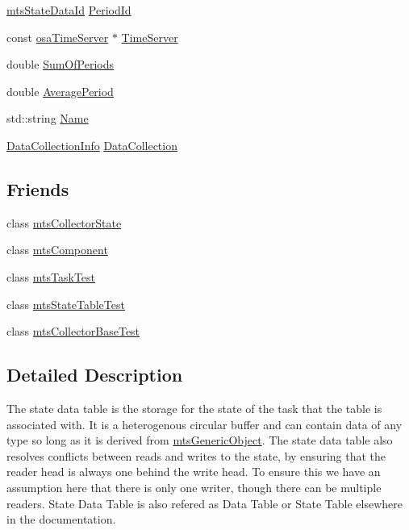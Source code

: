 \begin{DoxyCompactItemize}
\item 
\hyperlink{mts_state_table_8h_ac3a0e34e8991d51790b043fa01857a35}{mts\-State\-Data\-Id} \hyperlink{classmts_state_table_a1035a10fa91b94e61061abbd049d9eb6}{Period\-Id}
\item 
const \hyperlink{classosa_time_server}{osa\-Time\-Server} $\ast$ \hyperlink{classmts_state_table_a3d0a1bf75c293caad7ab30cd581b18e4}{Time\-Server}
\item 
double \hyperlink{classmts_state_table_a57adbe08f57772500f8066c64ad5b49b}{Sum\-Of\-Periods}
\item 
double \hyperlink{classmts_state_table_a5005978e1547af1b2b864fa366585468}{Average\-Period}
\item 
std\-::string \hyperlink{classmts_state_table_ad526708a4622c8cc4d9398bdb6b9ad5e}{Name}
\item 
\hyperlink{classmts_state_table_1_1_data_collection_info}{Data\-Collection\-Info} \hyperlink{classmts_state_table_ae1da5c16bcb4faa19c35c2cfb1dee023}{Data\-Collection}
\end{DoxyCompactItemize}
\subsection*{Friends}
\begin{DoxyCompactItemize}
\item 
class \hyperlink{classmts_state_table_ab6a86199b0302ca067ec09ec393d2ec5}{mts\-Collector\-State}
\item 
class \hyperlink{classmts_state_table_ae29f4c60efad294ccb670e319c43a4c1}{mts\-Component}
\item 
class \hyperlink{classmts_state_table_a6cdb4e8009fd76a9cf7e4e42b4bd0b8d}{mts\-Task\-Test}
\item 
class \hyperlink{classmts_state_table_a9113306eea81a3c08902921aefadbe22}{mts\-State\-Table\-Test}
\item 
class \hyperlink{classmts_state_table_a6743a1c340e3a1cc2078915e17f6678e}{mts\-Collector\-Base\-Test}
\end{DoxyCompactItemize}


\subsection{Detailed Description}
The state data table is the storage for the state of the task that the table is associated with. It is a heterogenous circular buffer and can contain data of any type so long as it is derived from \hyperlink{classmts_generic_object}{mts\-Generic\-Object}. The state data table also resolves conflicts between reads and writes to the state, by ensuring that the reader head is always one behind the write head. To ensure this we have an assumption here that there is only one writer, though there can be multiple readers. State Data Table is also refered as Data Table or State Table elsewhere in the documentation. 

